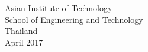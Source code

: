 \begin{center}
  \singlespace Asian Institute of Technology\\ School of Engineering
                  and Technology\\ Thailand\\ April 2017
\end{center}
\vfill
\begin{comment}

-------------------To be uncommented when writing final thesis

\newpage
\pagestyle{plain}
\addcontentsline{toc}{section}{Acknowledgments}
\onecolumn %
\if@twoside\else\raggedbottom\fi %
\setlength{\footskip}{8mm}
\begin{center}
{
  \large \bf Acknowledgments\\ \vskip 1em
}
\vskip 1em
\end{center}
\singlespace
\doublespace
\hspace{8.5mm}
\vspace{-1em}

I would like to thank all my family members for showing great support towards my dream of pursuing a Master’s degree. 
I also thank my Professors Dr. Vatcharaporn Esichaikul and Dr Matthew N. Dailey for guiding me in my academics and for helping me understand the concepts. 
\\
\\
Lastly I also humbly thank the staff of my Institution for their support and assistance in my  academic pursuit.
Above all I am grateful to the ominipresent spirit of the universe which guides me in achieving the milestones I imagined.


\newpage
\pagestyle{plain}
\addcontentsline{toc}{section}{Abstract}
\onecolumn %
\if@twoside\else\raggedbottom\fi %

\setlength{\footskip}{8mm}

\begin{center}
{\large \bf Abstract \\ \vskip 1em}
\vskip 1em
\end{center}
\singlespace
\doublespace
\hspace{8.5mm}
\vspace{-1em}

The telecom industry is very competitive. There is a huge customer base and they number of players are less. Hence occasional offers from competition results in loss of customer and a drop in revenue. The phenomenon is termed churning and it may occur in any service  industry. 
\\Thus this thesis is to control churning by modeling a system which is capable of identifying the customers. It also proposes decisions which could be taken to retain these customers.

\end{comment}
\setlength{\parskip}{0pt} 





